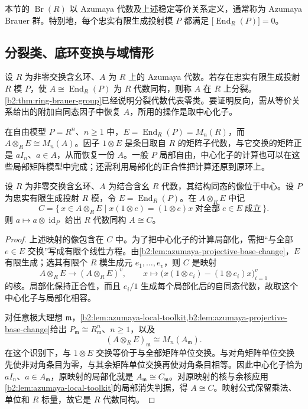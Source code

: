本节的 \(\operatorname{Br}(R)\) 以 Azumaya 代数及上述稳定等价关系定义，通常称为 Azumaya Brauer 群。特别地，每个忠实有限生成投射模 \(P\) 都满足 \(\bigl[\operatorname{End}_R(P)\bigr]=0\)。

\subsection{分裂类、底环变换与域情形}
\label{b2:subsec:C03:02}

设 \(R\) 为非零交换含幺环、\(A\) 为 \(R\) 上的 Azumaya 代数。若存在忠实有限生成投射 \(R\) 模 \(P\)，使 \(A\cong\operatorname{End}_R(P)\) 为 \(R\) 代数同构，则称 \(A\) 在 \(R\) 上分裂。\cref{b2:thm:ring-brauer-group}已经说明分裂代数代表零类。要证明反向，需从等价关系给出的附加自同态因子中恢复 \(A\)，所用的操作是取中心化子。

\ProseParagraphBreak
在自由模型 \(P=R^n\)、\(n\ge1\) 中，\(E=\operatorname{End}_R(P)=M_n(R)\)，而 \(A\otimes_RE\cong M_n(A)\)。因子 \(1\otimes E\) 是条目取自 \(R\) 的矩阵子代数，与它交换的矩阵正是 \(aI_n\)、\(a\in A\)，从而恢复一份 \(A\)。一般 \(P\) 局部自由，中心化子的计算也可以在这些局部矩阵模型中完成；还需利用局部化的正合性把计算还原到原环上。

\begin{lemma}[自同态因子的中心化子]\label{b2:lem:azumaya-end-centralizer}
	设 \(R\) 为非零交换含幺环、\(A\) 为结合含幺 \(R\) 代数，其结构同态的像位于中心。设 \(P\) 为忠实有限生成投射 \(R\) 模，令 \(E=\operatorname{End}_R(P)\)。在 \(A\otimes_RE\) 中记
	\[
		C=\{\,x\in A\otimes_RE\mid x(1\otimes e)=(1\otimes e)x\;\text{对全部}\;e\in E\;\text{成立}\,\}.
	\]
	则 \(a\mapsto a\otimes\operatorname{id}_P\) 给出 \(R\) 代数同构 \(A\cong C\)。
\end{lemma}
\begin{proof}
	上述映射的像包含在 \(C\) 中。为了把中心化子的计算局部化，需把“与全部 \(e\in E\) 交换”写成有限个线性方程。由\cref{b2:lem:azumaya-projective-base-change}，\(E\) 有限生成；选其有限个 \(R\) 模生成元 \(e_1,\ldots,e_v\)，则 \(C\) 是映射
	\[
		A\otimes_RE\longrightarrow (A\otimes_RE)^v, \qquad x\longmapsto\bigl(x(1\otimes e_i)-(1\otimes e_i)x\bigr)_{i=1}^v
	\]
	的核。局部化保持正合性，而且 \(e_i/1\) 生成每个局部化后的自同态代数，故取这个中心化子与局部化相容。

	对任意极大理想 \(\mathfrak m\)，\cref{b2:lem:azumaya-local-toolkit,b2:lem:azumaya-projective-base-change}给出 \(P_{\mathfrak m}\cong R_{\mathfrak m}^n\)、\(n\ge1\)，以及
	\[
		(A\otimes_RE)_{\mathfrak m}\cong M_n(A_{\mathfrak m}).
	\]
	在这个识别下，与 \(1\otimes E\) 交换等价于与全部矩阵单位交换。与对角矩阵单位交换先使非对角条目为零，与其余矩阵单位交换再使对角条目相等。因此中心化子恰为 \(aI_n\)、\(a\in A_{\mathfrak m}\)，原映射的局部化就是 \(A_{\mathfrak m}\cong C_{\mathfrak m}\)。对原映射的核与余核应用\cref{b2:lem:azumaya-local-toolkit}的局部消失判据，得 \(A\cong C\)。映射公式保留乘法、单位和 \(R\) 标量，故它是 \(R\) 代数同构。
\end{proof}

